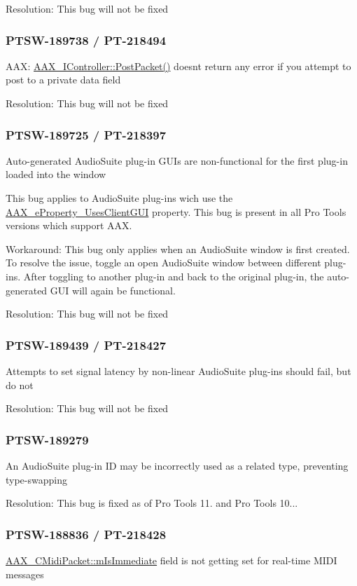 Resolution\+: This bug will not be fixed\hypertarget{a00374_PTSW-189738}{}\subsubsection{P\+T\+S\+W-\/189738 / P\+T-\/218494}\label{a00374_PTSW-189738}
A\+A\+X\+: \hyperlink{a00090_ae5dd2b5925dbc181513bca1c4ac5e716}{A\+A\+X\+\_\+\+I\+Controller\+::\+Post\+Packet()} doesn\textquotesingle{}t return any error if you attempt to post to a private data field

Resolution\+: This bug will not be fixed\hypertarget{a00374_PTSW-189725}{}\subsubsection{P\+T\+S\+W-\/189725 / P\+T-\/218397}\label{a00374_PTSW-189725}
Auto-\/generated Audio\+Suite plug-\/in G\+U\+Is are non-\/functional for the first plug-\/in loaded into the window

This bug applies to Audio\+Suite plug-\/ins wich use the \hyperlink{a00283_a6571f4e41a5dd06e4067249228e2249eaf48412738dcfcc56046718d9e5a034d7}{A\+A\+X\+\_\+e\+Property\+\_\+\+Uses\+Client\+G\+U\+I} property. This bug is present in all Pro Tools versions which support A\+A\+X.

Workaround\+: This bug only applies when an Audio\+Suite window is first created. To resolve the issue, toggle an open Audio\+Suite window between different plug-\/ins. After toggling to another plug-\/in and back to the original plug-\/in, the auto-\/generated G\+U\+I will again be functional.

Resolution\+: This bug will not be fixed\hypertarget{a00374_PTSW-189439}{}\subsubsection{P\+T\+S\+W-\/189439 / P\+T-\/218427}\label{a00374_PTSW-189439}
Attempts to set signal latency by non-\/linear Audio\+Suite plug-\/ins should fail, but do not

Resolution\+: This bug will not be fixed\hypertarget{a00374_PTSW-189279}{}\subsubsection{P\+T\+S\+W-\/189279}\label{a00374_PTSW-189279}
An Audio\+Suite plug-\/in I\+D may be incorrectly used as a related type, preventing type-\/swapping

Resolution\+: This bug is fixed as of Pro Tools 11. and Pro Tools 10...\hypertarget{a00374_PTSW-188836}{}\subsubsection{P\+T\+S\+W-\/188836 / P\+T-\/218428}\label{a00374_PTSW-188836}
\hyperlink{a00024_ab6fce0aee8fb08695ac8a112b3c3e7fa}{A\+A\+X\+\_\+\+C\+Midi\+Packet\+::m\+Is\+Immediate} field is not getting set for real-\/time M\+I\+D\+I messages

